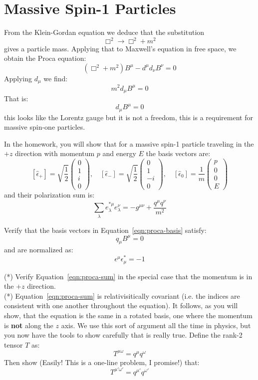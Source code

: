 \documentclass[12pt]{article}
\begin{document}
\section{Massive Spin-1 Particles}
From the Klein-Gordan equation we deduce that the substitution 
$$\Box^2 \to \Box^2 +m^2$$
gives a particle mass.  Applying that to Maxwell's equation in free
space, we obtain the Proca equation:
$$(\Box^2 + m^2) B^\mu - d^\mu d_\nu B^\nu = 0$$
Applying $d_\mu$ we find:
$$m^2 d_\mu B^\mu = 0$$
That is:
$$d_\mu B^\mu = 0$$
this looks like the Lorentz gauge but it is not a freedom, this is a
requirement for massive spin-one particles.

In the homework, you will show that for a massive spin-1 particle
traveling in the $+z$ direction with momentum $p$ and energy $E$ the
basis vectors are:
\begin{equation}
\label{eqn:proca-basis}
[\hat{\epsilon}_+] = \sqrt{\frac{1}{2}}\begin{pmatrix} 0 \\ 1 \\ i \\ 0 \end{pmatrix}, \quad
[\hat{\epsilon}_-] = \sqrt{\frac{1}{2}}\begin{pmatrix} 0 \\ 1 \\ -i \\ 0 \end{pmatrix}, \quad
[\hat{\epsilon}_0] = \frac{1}{m}\begin{pmatrix} p \\ 0 \\ 0 \\ E \end{pmatrix}
\end{equation}
and their polarization sum is:
\begin{equation}
\label{eqn:proca-sum}
\sum_\lambda e^{*\mu}_\lambda e^\nu_\lambda = -g^{\mu\nu} + \frac{q^\mu q^\nu}{m^2}
\end{equation}

\exercise Verify that the basis vectors in Equation~\ref{eqn:proca-basis} satisfy:
$$q_\mu B^\mu = 0$$
and are normalized as:
$$\epsilon^\mu \epsilon_\mu^* = -1$$

\exercise (*) Verify Equation~\ref{eqn:proca-sum} in the special case that the momentum is in the $+z$ direction.\\[5pt]


\exercise (*) Equation~\ref{eqn:proca-sum} is relativisitically covariant
(i.e. the indices are consistent with one another throughout the
equation).  It follows, as you will show, that the equation is the same in
a rotated basis, one where the momentum is {\bf not} along the $z$ axis.
We use this sort of argument all the time in physics, but you now have the
tools to show carefully that is really true.  Define the rank-2
tensor $T$ as:
$$T^{\mu\omega} = q^\mu q^\omega$$
Then show (Easily! This is a one-line problem, I promise!) that:
$$T^{\mu'\omega'} = q^{\mu'} q^{\omega'}$$
~\\[5pt]
\end{document}

